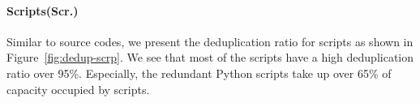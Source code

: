 
%

%

\paragraph{Scripts(Scr.)}


Similar to source codes, we present the deduplication ratio for scripts as shown in
Figure~\ref{fig:dedup-scrp}.
We see that most of the scripts have a high deduplication ratio over 95\%. Especially, the redundant Python scripts take up over 65\% of capacity occupied by scripts. 

